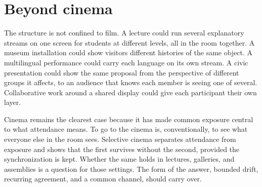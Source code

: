 \section{Beyond cinema}

The structure is not confined to film. A lecture could run several explanatory streams on one screen for students at different levels, all in the room together. A museum installation could show visitors different histories of the same object. A multilingual performance could carry each language on its own stream. A civic presentation could show the same proposal from the perspective of different groups it affects, to an audience that knows each member is seeing one of several. Collaborative work around a shared display could give each participant their own layer.

Cinema remains the clearest case because it has made common exposure central to what attendance means. To go to the cinema is, conventionally, to see what everyone else in the room sees. Selective cinema separates attendance from exposure and shows that the first survives without the second, provided the synchronization is kept. Whether the same holds in lectures, galleries, and assemblies is a question for those settings. The form of the answer, bounded drift, recurring agreement, and a common channel, should carry over.
